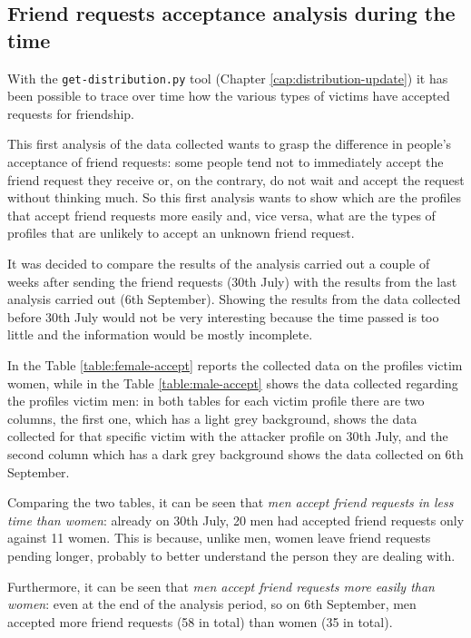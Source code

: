 \subsection{Friend requests acceptance analysis during the time}
With the \texttt{get-distribution.py} tool (Chapter \ref{cap:distribution-update}) it has been possible to trace over time how the various types of victims have accepted requests for friendship.
\par \noindent 
This first analysis of the data collected wants to grasp the difference in people's acceptance of friend requests: some people tend not to immediately accept the friend request they receive or, on the contrary, do not wait and accept the request without thinking much. So this first analysis wants to show which are the profiles that accept friend requests more easily and, vice versa, what are the types of profiles that are unlikely to accept an unknown friend request.
\par \noindent 
It was decided to compare the results of the analysis carried out a couple of weeks after sending the friend requests (30th July) with the results from the last analysis carried out (6th September). Showing the results from the data collected before 30th July would not be very interesting because the time passed is too little and the information would be mostly incomplete.
\par \noindent 
In the Table \ref{table:female-accept} reports the collected data on the profiles victim women, while in the Table \ref{table:male-accept} shows the data collected regarding the profiles victim men: in both tables for each victim profile there are two columns, the first one, which has a light grey background, shows the data collected for that specific victim with the attacker profile on 30th July, and the second column which has a dark grey background shows the data collected on 6th September.
\par \noindent 
Comparing the two tables, it can be seen that \textit{men accept friend requests in less time than women}: already on 30th July, 20 men had accepted friend requests only against 11 women. This is because, unlike men, women leave friend requests pending longer, probably to better understand the person they are dealing with.
\par \noindent 
Furthermore, it can be seen that \textit{men accept friend requests more easily than women}: even at the end of the analysis period, so on 6th September, men accepted more friend requests (58 in total) than women (35 in total).
